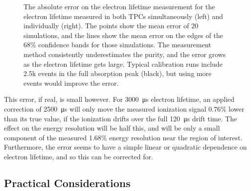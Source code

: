 \documentclass[herrin-thesis.tex]{subfiles}
\begin{document}
\begin{figure}[htbp]
\begin{subfigure}[b]{0.5\linewidth}
\end{subfigure}
\caption[Error on reconstructed electron lifetime from simulation]{The absolute error on the electron lifetime measurement for the electron lifetime measured in both TPCs simultaneously (left) and individually (right). The points show the mean error of 20 simulations, and the lines show the mean error on the edges of the 68\% confidence bands for those simulations. The measurement method consistently underestimates the purity, and the error grows as the electron lifetime gets large. Typical calibration runs include 2.5k events in the full absorption peak (black), but using more events would improve the error.}
\label{fig:sim_err}
\end{figure}

This error, if real, is small however. For \SI{3000}{\micro\second} electron lifetime, an applied correction of  \SI{2500}{\micro\second} will only move the measured ionization signal 0.76\% lower than its true value, if the ionization drifts over the full  \SI{120}{\micro\second}  drift time. The effect on the energy resolution will be half this, and will be only a small component of the measured 1.68\% energy resolution  near the \zeronu region of interest. Furthermore, the error seems to have a simple linear or quadratic dependence on electron lifetime, and so this can be corrected for.

\subsection{Practical Considerations}
\end{document}
